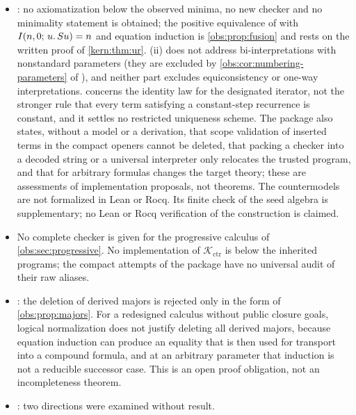 \begin{itemize}
bi-interpretation through a different definable domain. The package does not
show that  fails to be admissible over the seven rules with the
identity scheme alone (\cref{obs:rem:fp-scope}); this is settled by
\cref{obs:cor:qi-identity} of .
It does not decide the uniqueness rule for the successor update in its model.
\item {}: no axiomatization below the
observed minima, no new checker and no minimality statement is obtained; the
positive equivalence of  with $I(n,0;\,u.\,S u)=n$ and
equation induction is \cref{obs:prop:fusion} and rests on the written proof of
\cref{kern:thm:ur}. (ii) does not address
bi-interpretations with nonstandard parameters (they are excluded by
\cref{obs:cor:numbering-parameters} of ), and neither part excludes
equiconsistency or one-way interpretations. 
concerns the identity law for the designated iterator, not the stronger rule
that every term satisfying a constant-step recurrence is constant, and it
settles no restricted uniqueness scheme. The package also states, without a
model or a derivation, that scope validation of inserted terms in the compact
openers cannot be deleted, that packing a checker into a decoded string or a
universal interpreter only relocates the trusted program, and that
 for arbitrary formulas changes the target theory; these are
assessments of implementation proposals, not theorems. The countermodels are
not formalized in Lean or Rocq. Its finite check of the
seed algebra is supplementary; no Lean or Rocq verification of the
construction is claimed.
\item No complete checker is given for the progressive calculus of
\cref{obs:sec:progressive}. No implementation of $\mathcal{K}_{\mathrm{ctr}}$
is below the inherited programs; the compact attempts of the package have no
universal audit of their raw aliases.
\item {}: the deletion of derived majors is rejected only in
the form of \cref{obs:prop:majors}. For a redesigned calculus without public
closure goals, logical normalization does not justify deleting all derived
majors, because equation induction can produce an equality that is then used
for transport into a compound formula, and at an arbitrary parameter that
induction is not a reducible successor case. This is an open proof obligation,
not an incompleteness theorem.
\item {}: two directions were examined without result.

\end{itemize}
